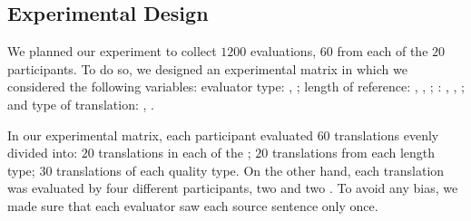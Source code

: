 

\subsection{Experimental Design}
We planned our experiment to collect $1200$ evaluations, $60$ from each of the $20$ participants.  To do so, we designed an experimental matrix in which we considered the following variables: \Ni evaluator type: \mono, \bil; \Nii length of reference: \lshort, \lmid, \llong; \Niii \gamet: \src, \srctgt, \tgt; and \Niv type of translation: \qmin, \qmax.

In our experimental matrix, each participant evaluated $60$ translations evenly divided into: $20$ translations in each of the \gamet; $20$ translations from each length type; $30$ translations of each quality type. On the other hand, each translation was evaluated by four different participants, two \bil and two \mono.
To avoid any bias, we made sure that each evaluator 
saw each source sentence only once.



